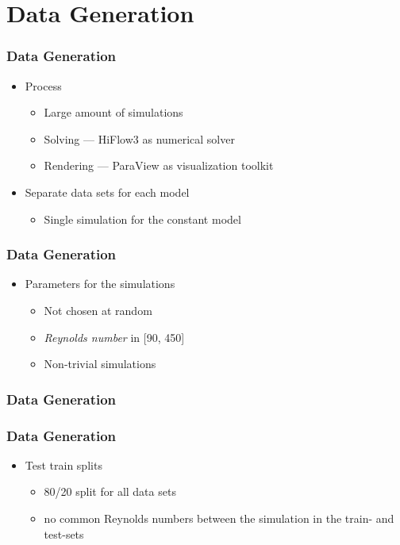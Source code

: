 \documentclass[18pt]{beamer}
\begin{document}
\section{Data Generation}

\begin{frame}
  \frametitle{Data Generation}
  \begin{itemize}
  \item Process
    \begin{itemize}
    \item Large amount of simulations
    \item Solving --- HiFlow3 as numerical solver
    \item Rendering --- ParaView as visualization toolkit
    \end{itemize}

  \item Separate data sets for each model
    \begin{itemize}
    \item Single simulation for the constant model
    \end{itemize}
  \end{itemize}
\end{frame}

\begin{frame}
  \frametitle{Data Generation}
  \begin{itemize}
  \item Parameters for the simulations
    \begin{itemize}
    \item Not chosen at random
    \item \textit{Reynolds number} in [90, 450]
    \item Non-trivial simulations
    \end{itemize}
  \end{itemize}
\end{frame}

\begin{frame}
  \frametitle{Data Generation}
\end{frame}

\begin{frame}
  \frametitle{Data Generation}

  \begin{itemize}
  \item Test train splits
    \begin{itemize}
    \item 80\slash 20 split for all data sets
    \item no common Reynolds numbers between the simulation in the train- and test-sets
    \end{itemize}
  \end{itemize}
\end{frame}
\end{document}
